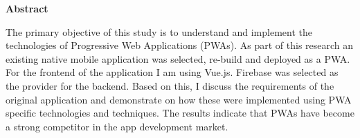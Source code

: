 \thispagestyle{empty}

\textbf{Abstract}


The primary objective of this study is to understand and implement the technologies of Progressive Web Applications (PWAs).
As part of this research an existing native mobile application was selected, re-build and deployed as a PWA. For the frontend of the application I am using Vue.js. Firebase was selected as the provider for the backend. Based on this, I discuss the requirements of the original application and demonstrate on how these were implemented using PWA specific technologies and techniques. The results indicate that PWAs have become a strong competitor in the app development market.
